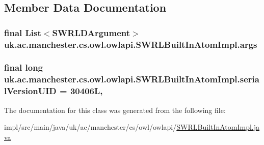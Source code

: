 \subsection{Member Data Documentation}
\hypertarget{classuk_1_1ac_1_1manchester_1_1cs_1_1owl_1_1owlapi_1_1_s_w_r_l_built_in_atom_impl_a4e5b8d2530722a62574df36531152156}{
\subsubsection[{args}]{\setlength{\rightskip}{0pt plus 5cm}final List$<${\bf S\-W\-R\-L\-D\-Argument}$>$ uk.\-ac.\-manchester.\-cs.\-owl.\-owlapi.\-S\-W\-R\-L\-Built\-In\-Atom\-Impl.\-args\hspace{0.3cm}{\ttfamily [private]}}}\label{classuk_1_1ac_1_1manchester_1_1cs_1_1owl_1_1owlapi_1_1_s_w_r_l_built_in_atom_impl_a4e5b8d2530722a62574df36531152156}
\hypertarget{classuk_1_1ac_1_1manchester_1_1cs_1_1owl_1_1owlapi_1_1_s_w_r_l_built_in_atom_impl_a5856c225d8f3f5349fe4fca9a3ff47a3}{
\subsubsection[{serial\-Version\-U\-I\-D}]{\setlength{\rightskip}{0pt plus 5cm}final long uk.\-ac.\-manchester.\-cs.\-owl.\-owlapi.\-S\-W\-R\-L\-Built\-In\-Atom\-Impl.\-serial\-Version\-U\-I\-D = 30406\-L\hspace{0.3cm}{\ttfamily [static]}, {\ttfamily [private]}}}\label{classuk_1_1ac_1_1manchester_1_1cs_1_1owl_1_1owlapi_1_1_s_w_r_l_built_in_atom_impl_a5856c225d8f3f5349fe4fca9a3ff47a3}


The documentation for this class was generated from the following file\-:\begin{DoxyCompactItemize}
\item 
impl/src/main/java/uk/ac/manchester/cs/owl/owlapi/\hyperlink{_s_w_r_l_built_in_atom_impl_8java}{S\-W\-R\-L\-Built\-In\-Atom\-Impl.\-java}\end{DoxyCompactItemize}
